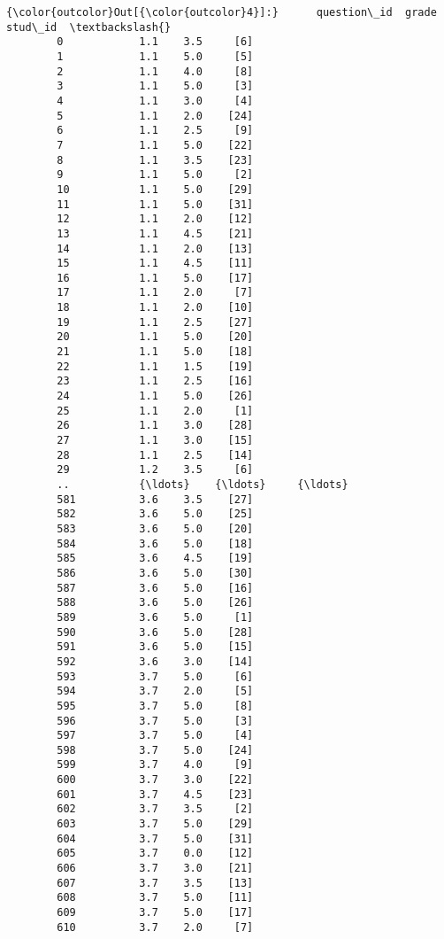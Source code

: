 \documentclass[11pt]{article}
\begin{document}
\begin{Verbatim}[commandchars=\\\{\}]
{\color{outcolor}Out[{\color{outcolor}4}]:}      question\_id  grade stud\_id  \textbackslash{}
        0            1.1    3.5     [6]   
        1            1.1    5.0     [5]   
        2            1.1    4.0     [8]   
        3            1.1    5.0     [3]   
        4            1.1    3.0     [4]   
        5            1.1    2.0    [24]   
        6            1.1    2.5     [9]   
        7            1.1    5.0    [22]   
        8            1.1    3.5    [23]   
        9            1.1    5.0     [2]   
        10           1.1    5.0    [29]   
        11           1.1    5.0    [31]   
        12           1.1    2.0    [12]   
        13           1.1    4.5    [21]   
        14           1.1    2.0    [13]   
        15           1.1    4.5    [11]   
        16           1.1    5.0    [17]   
        17           1.1    2.0     [7]   
        18           1.1    2.0    [10]   
        19           1.1    2.5    [27]   
        20           1.1    5.0    [20]   
        21           1.1    5.0    [18]   
        22           1.1    1.5    [19]   
        23           1.1    2.5    [16]   
        24           1.1    5.0    [26]   
        25           1.1    2.0     [1]   
        26           1.1    3.0    [28]   
        27           1.1    3.0    [15]   
        28           1.1    2.5    [14]   
        29           1.2    3.5     [6]   
        ..           {\ldots}    {\ldots}     {\ldots}   
        581          3.6    3.5    [27]   
        582          3.6    5.0    [25]   
        583          3.6    5.0    [20]   
        584          3.6    5.0    [18]   
        585          3.6    4.5    [19]   
        586          3.6    5.0    [30]   
        587          3.6    5.0    [16]   
        588          3.6    5.0    [26]   
        589          3.6    5.0     [1]   
        590          3.6    5.0    [28]   
        591          3.6    5.0    [15]   
        592          3.6    3.0    [14]   
        593          3.7    5.0     [6]   
        594          3.7    2.0     [5]   
        595          3.7    5.0     [8]   
        596          3.7    5.0     [3]   
        597          3.7    5.0     [4]   
        598          3.7    5.0    [24]   
        599          3.7    4.0     [9]   
        600          3.7    3.0    [22]   
        601          3.7    4.5    [23]   
        602          3.7    3.5     [2]   
        603          3.7    5.0    [29]   
        604          3.7    5.0    [31]   
        605          3.7    0.0    [12]   
        606          3.7    3.0    [21]   
        607          3.7    3.5    [13]   
        608          3.7    5.0    [11]   
        609          3.7    5.0    [17]   
        610          3.7    2.0     [7]   
        

\end{Verbatim}
\end{document}
